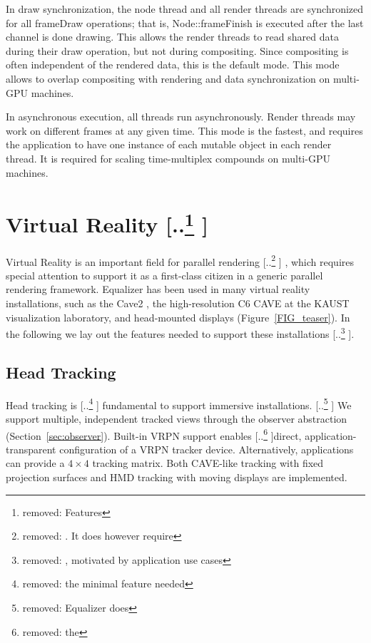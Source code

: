 \documentclass[10pt,journal,compsoc]{IEEEtran}
\newcommand{\sref}[1]{Section~\ref{#1}}
\newcommand{\fig}[1]{Figure~\ref{#1}}
\providecommand{\DIFaddtex}[1]{{\protect\color{blue} \sf #1}} %
\providecommand{\DIFdeltex}[1]{{\protect\color{red} [..\footnote{removed: #1} ]}} %
\providecommand{\DIFaddbegin}{} %
\providecommand{\DIFaddend}{} %
\providecommand{\DIFdelbegin}{} %
\providecommand{\DIFdelend}{} %
\providecommand{\DIFadd}[1]{\texorpdfstring{\DIFaddtex{#1}}{#1}} %
\providecommand{\DIFdel}[1]{\texorpdfstring{\DIFdeltex{#1}}{}} %
\newcommand{\DIFscaledelfig}{0.5}
\newlength{\DIFdelgraphicswidth} %
\newlength{\DIFdelgraphicsheight} %
\newcommand{\DIFaddincludegraphics}[2][]{{\color{blue}\fbox{\DIFOincludegraphics[#1]{#2}}}} %
\newcommand{\DIFdelincludegraphics}[2][]{%
\sbox{\DIFdelgraphicsbox}{\DIFOincludegraphics[#1]{#2}}%
\settoboxwidth{\DIFdelgraphicswidth}{\DIFdelgraphicsbox} %
\settoboxtotalheight{\DIFdelgraphicsheight}{\DIFdelgraphicsbox} %
\scalebox{\DIFscaledelfig}{%
\parbox[b]{\DIFdelgraphicswidth}{\usebox{\DIFdelgraphicsbox}\\[-\baselineskip] \rule{\DIFdelgraphicswidth}{0em}}\llap{\resizebox{\DIFdelgraphicswidth}{\DIFdelgraphicsheight}{%
\setlength{\unitlength}{\DIFdelgraphicswidth}%
\begin{picture}(1,1)%
\thicklines\linethickness{2pt} %
{\color[rgb]{1,0,0}\put(0,0){\framebox(1,1){}}}%
{\color[rgb]{1,0,0}\put(0,0){\line( 1,1){1}}}%
{\color[rgb]{1,0,0}\put(0,1){\line(1,-1){1}}}%
\end{picture}%
}\hspace*{3pt}}} %
} %
\DeclareRobustCommand{\DIFaddbegin}{\DIFOaddbegin \let\includegraphics\DIFaddincludegraphics} %
\DeclareRobustCommand{\DIFaddend}{\DIFOaddend \let\includegraphics\DIFOincludegraphics} %
\DeclareRobustCommand{\DIFdelbegin}{\DIFOdelbegin \let\includegraphics\DIFdelincludegraphics} %
\DeclareRobustCommand{\DIFdelend}{\DIFOaddend \let\includegraphics\DIFOincludegraphics} %
\begin{document}
In draw synchronization, the node thread and all render threads are synchronized
for all \textsf{frameDraw} operations; that is, \textsf{Node::frameFinish} is
executed after the last channel is done drawing. This allows the render threads
to read shared data during their draw operation, but not during compositing.
Since compositing is often independent of the rendered data, this is the default
mode. This mode allows to overlap compositing with rendering and data
synchronization on multi-GPU machines.

In asynchronous execution, all threads run asynchronously. Render threads may
work on different frames at any given time. This mode is the fastest, and
requires the application to have one instance of each mutable object in each
render thread. It is required for scaling time-multiplex compounds on multi-GPU
machines.

\section{Virtual Reality\DIFdelbegin \DIFdel{Features}\DIFdelend }

Virtual Reality is an important field for parallel rendering\DIFdelbegin \DIFdel{. It does however
require }\DIFdelend \DIFaddbegin \DIFadd{, which requires
}\DIFaddend special attention to support it as a first-class citizen in a generic parallel
rendering framework. \textsf{Equalizer} has been used in many virtual reality
installations, such as the Cave2 \cite{FNTTL:13}, the high-resolution C6 CAVE
at the KAUST visualization laboratory, and head-mounted displays
(\fig{FIG_teaser}). In the following we lay out the features needed to support
these installations\DIFdelbegin \DIFdel{, motivated by application use cases}\DIFdelend .

\subsection{Head Tracking}

Head tracking is \DIFdelbegin \DIFdel{the minimal feature needed }\DIFdelend \DIFaddbegin \DIFadd{fundamental }\DIFaddend to support immersive installations. \DIFdelbegin \DIFdel{\textsf{Equalizer} does }\DIFdelend \DIFaddbegin \DIFadd{We }\DIFaddend support
multiple, independent tracked views through the observer abstraction
(\sref{sec:observer}). Built-in VRPN support enables \DIFdelbegin \DIFdel{the
}\DIFdelend direct,
application-transparent configuration of a VRPN tracker device. Alternatively,
applications can provide a $4\times 4$ tracking matrix. Both CAVE-like tracking
with fixed projection surfaces and HMD tracking with moving displays are
implemented.
\end{document}
